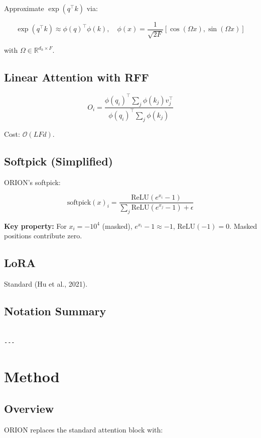 Approximate $\exp(q^\top k)$ via:

\[
\exp(q^\top k) \approx \phi(q)^\top \phi(k), \quad
\phi(x) = \frac{1}{\sqrt{2F}} [\cos(\Omega x), \sin(\Omega x)]
\tag{3.4}
\]

with $\Omega \in \mathbb{R}^{d_h \times F}$.

\subsection{Linear Attention with RFF}

\[
O_i = \frac{\phi(q_i)^\top \sum_j \phi(k_j) v_j^\top}{\phi(q_i)^\top \sum_j \phi(k_j)}
\tag{3.5}
\]

Cost: $\mathcal{O}(L F d)$.

\subsection{Softpick (Simplified)}

ORION's softpick:

\[
\text{softpick}(x)_i = \frac{\text{ReLU}(e^{x_i} - 1)}{\sum_j \text{ReLU}(e^{x_j} - 1) + \epsilon}
\tag{3.6}
\]

\textbf{Key property:} For $x_i = -10^4$ (masked), $e^{x_i} - 1 \approx -1$, 
$\text{ReLU}(-1) = 0$. Masked positions contribute zero.

\subsection{LoRA}

Standard (Hu et al., 2021).

\subsection{Notation Summary}

\begin{lstlisting}

---
\end{lstlisting}


\section{Method}

\subsection{Overview}

ORION replaces the standard attention block with:

